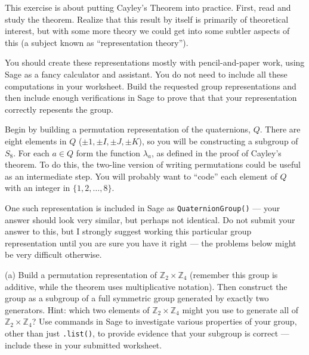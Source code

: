 \begin{sageverbatim}\end{sageverbatim}
%
%
This exercise is about putting Cayley's Theorem into practice.  First, read and study the theorem.  Realize that this result by itself is primarily of theoretical interest, but with some more theory we could get into some subtler aspects of this (a subject known as ``representation theory'').\par
%
You should create these representations mostly with pencil-and-paper work, using Sage as a fancy calculator and assistant.  You do not need to include all these computations in your worksheet.  Build the requested group representations and then include enough verifications in Sage to prove that that your representation correctly repesents the group.\par
%
Begin by building a permutation representation of the quaternions, $Q$.  There are eight elements in $Q$ ($\pm 1, \pm I, \pm J, \pm K$), so you will be constructing a subgroup of $S_8$.  For each $a\in Q$ form the function $\lambda_a$, as defined in the proof of Cayley's theorem.  To do this, the two-line version of writing permutations could be useful as an intermediate step.  You will probably want to ``code'' each element of $Q$ with an integer in $\{1,2,\dots,8\}$.\par
%
One such representation is included in Sage as \verb?QuaternionGroup()? --- your answer should look very similar, but perhaps not identical.  Do not submit your answer to this, but I strongly suggest working this particular group representation until you are sure you have it right --- the problems below might be very difficult otherwise.\par
%
(a) Build a permutation representation of ${\mathbb Z}_2\times{\mathbb Z}_4$ (remember this group is additive, while the theorem uses multiplicative notation).  Then construct the group as a subgroup of a full symmetric group generated by exactly two generators.  Hint: which two elements of ${\mathbb Z}_2\times{\mathbb Z}_4$ might you use to generate all of ${\mathbb Z}_2\times{\mathbb Z}_4$?  Use commands in Sage to investigate various properties of your group, other than just \verb?.list()?, to provide evidence that your subgroup is correct --- include these in your submitted worksheet.\par
